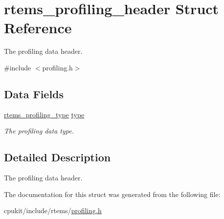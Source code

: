 \hypertarget{structrtems__profiling__header}{}\section{rtems\+\_\+profiling\+\_\+header Struct Reference}
\label{structrtems__profiling__header}


The profiling data header.  




{\ttfamily \#include $<$profiling.\+h$>$}

\subsection*{Data Fields}
\begin{DoxyCompactItemize}
\item 
\mbox{\label{structrtems__profiling__header_aa2e32b292a00d5906109e6fbfaa824dd}} 
\mbox{\hyperlink{group__Profiling_ga8e677119cdafc1bfb0cecbb6b8f48eb2}{rtems\+\_\+profiling\+\_\+type}} \mbox{\hyperlink{structrtems__profiling__header_aa2e32b292a00d5906109e6fbfaa824dd}{type}}
\begin{DoxyCompactList}\small\item\em The profiling data type. \end{DoxyCompactList}\end{DoxyCompactItemize}


\subsection{Detailed Description}
The profiling data header. 

The documentation for this struct was generated from the following file\+:\begin{DoxyCompactItemize}
\item 
cpukit/include/rtems/\mbox{\hyperlink{profiling_8h}{profiling.\+h}}\end{DoxyCompactItemize}
